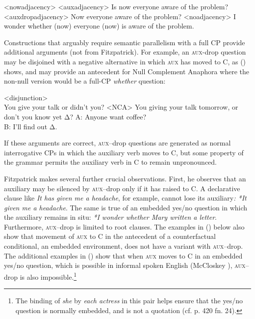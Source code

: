 \documentclass[output=paper]{langscibook}
\begin{document}
\pex<nowadjacency>
\a<auxadjacency> \ljudge{*}Is now everyone aware of the problem?
\a<auxdropadjacency> \ljudge{*}Now everyone aware of the problem?
\a<noadjacency> I wonder whether (now) everyone (now) is aware of the problem.
\xe

\noindent Constructions that arguably require semantic parallelism with a full CP provide additional arguments (not from Fitzpatrick). For example, an \textsc{aux-}drop question may be disjoined with a negative alternative in which \textsc{aux} has moved to C, as () shows, and may provide an antecedent for Null Complement Anaphora where the non-null version would be a full-CP \textit{whether} question:

\pex<disjunction>
\\
You give your talk or didn't you?
\xe
\pex[aboveexskip=0pt]<NCA>
\a You giving your talk tomorrow, or don't you know yet Δ?
\a A: Anyone want coffee? \\B: I'll find out Δ.
\xe

\noindent If these arguments are correct, \textsc{aux}--drop questions are generated as normal interrogative CPs in which the auxiliary verb moves to C, but some property of the grammar permits the auxiliary verb in C to remain unpronounced. 

Fitzpatrick makes several further crucial observations. First, he observes that an auxiliary may be silenced by \textsc{aux}--drop only if it has raised to C. A declarative clause like \textit{It has given me a headache}, for example, cannot lose its auxiliary\textit{: {*}It given me a headache}. The same is true of an embedded yes/no question in which the auxiliary remains in situ: \textit{{*}I wonder whether Mary written a letter}. Furthermore, \textsc{aux}--drop is limited to root clauses. The examples in () below also show that movement of \textsc{aux} to C in the antecedent of a counterfactual conditional, an embedded environment, does not have a variant with \textsc{aux}--drop. The additional examples in () show that when \textsc{aux} moves to C in an embedded yes/no question, which is possible in informal spoken English (McCloskey \citeyear{McCloskey:2006}), \textsc{aux}--drop is also impossible.\footnote{The binding of \textit{she} by \textit{each actress} in this pair helps ensure that the yes/no question is normally embedded, and is not a quotation (cf. \citealt{fitzpatrick2006deletion} p. 420 fn. 24).} 
\end{document}
